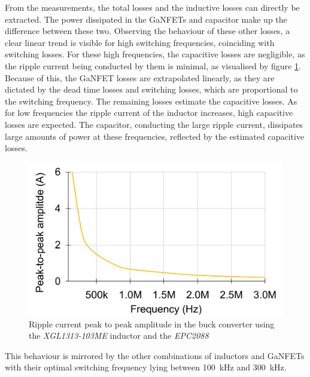 From the measurements, the total losses and the inductive losses can directly be extracted. The power dissipated in the \acp{GaNFET} and capacitor make up the difference between these two. Observing the behaviour of these other losses, a clear linear trend is visible for high switching frequencies, coinciding with switching losses. For these high frequencies, the capacitive losses are negligible, as the ripple current being conducted by them is minimal, as visualised by figure \ref{fig:bc_ripple_current}. Because of this, the \ac{GaNFET} losses are extrapolated linearly, as they are dictated by the dead time losses and switching losses, which are proportional to the switching frequency. The remaining losses estimate the capacitive losses. As for low frequencies the ripple current of the inductor increases, high capacitive losses are expected. The capacitor, conducting the large ripple current, dissipates large amounts of power at these frequencies, reflected by the estimated capacitive losses.
\begin{figure}[H]
    \centering
    \includegraphics[width=0.6\linewidth]{Bilder//Kapitel4/BC_Meas_Ripple_Current.pdf}
    \caption{Ripple current peak to peak amplitude in the buck converter using the \textit{XGL1313-103ME} inductor and the \textit{EPC2088}}
    \label{fig:bc_ripple_current}
\end{figure}
This behaviour is mirrored by the other combinations of inductors and \acp{GaNFET} with their optimal switching frequency lying between \SI{100}{\kilo\Hz} and \SI{300}{\kilo\Hz}. 

